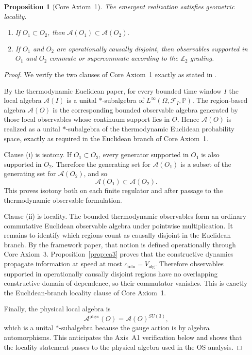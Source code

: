 \documentclass[11pt]{article}
\newtheorem{proposition}[theorem]{Proposition}
\theoremstyle{definition}
\theoremstyle{remark}
\newcommand{\mcA}{\mathcal A}
\begin{document}
\begin{proposition}[Core Axiom~1]
\label{prop:ca1}
The emergent realization satisfies geometric locality.
\begin{enumerate}[label=\textnormal{(\roman*)},leftmargin=1.5em]
\item If $O_1\subset O_2$, then $\mcA(O_1)\subset \mcA(O_2)$.
\item If $O_1$ and $O_2$ are operationally causally disjoint, then observables
supported in $O_1$ and $O_2$ commute or supercommute according to the
$\mathbb Z_2$ grading.
\end{enumerate}
\end{proposition}

\begin{proof}
We verify the two clauses of Core Axiom~1 exactly as stated in
\cite[Core Axiom~1]{axioms}.

By the thermodynamic Euclidean paper, for every bounded time window $I$ the
local algebra $\mcA(I)$ is a unital $*$-subalgebra of
$L^\infty(\Omega,\mathcal F_I,\mathbb P)$.  The region-based algebra $\mcA(O)$ is the
corresponding bounded observable algebra generated by those local observables
whose continuum support lies in $O$.  Hence $\mcA(O)$ is realized as a unital
$*$-subalgebra of the thermodynamic Euclidean probability space, exactly as
required in the Euclidean branch of Core Axiom~1.

Clause \textnormal{(i)} is isotony.  If $O_1\subset O_2$, every generator
supported in $O_1$ is also supported in $O_2$.  Therefore the generating set
for $\mcA(O_1)$ is a subset of the generating set for $\mcA(O_2)$, and so
\[
\mcA(O_1)\subset \mcA(O_2).
\]
This proves isotony both on each finite regulator and after passage to the
thermodynamic observable formulation.

Clause \textnormal{(ii)} is locality.  The bounded thermodynamic observables
form an ordinary commutative Euclidean observable algebra under pointwise
multiplication.  It remains to identify which regions count as causally
disjoint in the Euclidean branch.  By the framework paper, that notion is
defined operationally through Core Axiom~3.  Proposition~\ref{prop:ca3} proves
that the constructive dynamics propagate information at speed at most
$c_{\mathrm{info}}=V_{\mathrm{alg}}$.  Therefore observables supported in
operationally causally disjoint regions have no overlapping constructive domain
of dependence, so their commutator vanishes.  This is exactly the
Euclidean-branch locality clause of Core Axiom~1.

Finally, the physical local algebra is
\[
\mcA^{\mathrm{phys}}(O)=\mcA(O)^{SU(3)},
\]
which is a unital $*$-subalgebra because the gauge action is by algebra
automorphisms.  This anticipates the Axis~A1 verification below and shows that
the locality statement passes to the physical algebra used in the OS analysis.
\end{proof}
\end{document}
